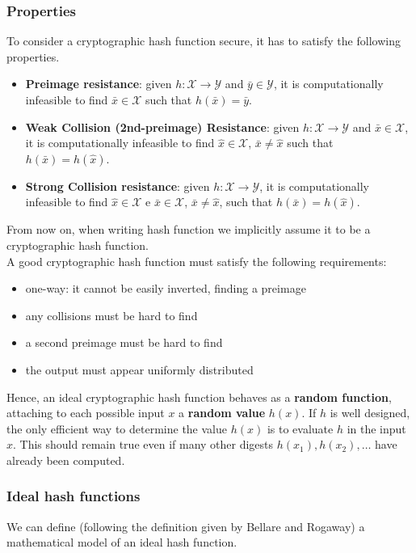 \documentclass[a4paper, 10pt, titlepage]{article}
\begin{document}
\subsubsection*{Properties}
To consider a cryptographic hash function secure, it has to satisfy the following properties.
\begin{itemize}
\item \textbf{Preimage resistance}: given $h : \mathcal{X} \rightarrow \mathcal{Y}$ and $\bar{y} \in \mathcal{Y}$, it is computationally infeasible to find $\bar{x} \in \mathcal{X}$ such that $h(\bar{x}) = \bar{y}$.
\item \textbf{Weak Collision (2nd-preimage) Resistance}: given $h: \mathcal{X} \rightarrow \mathcal{Y}$ and $\bar{x} \in \mathcal{X}$, it is computationally infeasible to find $\hat{x} \in \mathcal{X}$, $\bar{x} \neq \hat{x}$ such that $h(\bar{x}) = h(\hat{x})$.
\item \textbf{Strong Collision resistance}: given $h : \mathcal{X} \rightarrow \mathcal{Y}$, it is computationally infeasible to find $\hat{x} \in \mathcal{X}$ e $\bar{x} \in \mathcal{X}$, $\bar{x} \neq \hat{x}$, such that $h(\bar{x}) = h(\hat{x})$.
\end{itemize}
From now on, when writing hash function we implicitly assume it to be a cryptographic hash function. \\
A good cryptographic hash function must satisfy the following requirements:
\begin{itemize}
\item one-way: it cannot be easily inverted, finding a preimage
\item any collisions must be hard to find
\item a second preimage must be hard to find
\item the output must appear uniformly distributed
\end{itemize}
Hence, an ideal cryptographic hash function behaves as a \textbf{random function}, attaching to each possible input $x$ a \textbf{random value} $h(x)$.
If $h$ is well designed, the only efficient way to determine the value $h(x)$ is to evaluate $h$ in the input $x$. This should remain true even if many other digests $h(x_1), h(x_2), \dots$ have already been computed.
\subsubsection*{Ideal hash functions}
We can define (following the definition given by Bellare and Rogaway) a mathematical model of an ideal hash function.
\end{document}
